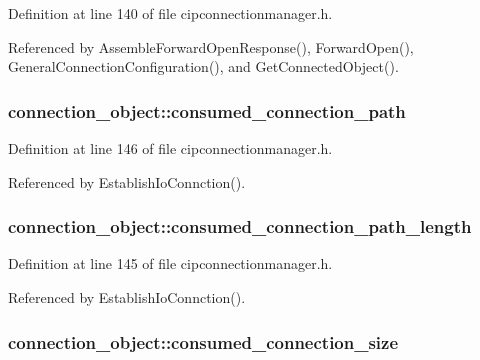 \-Definition at line 140 of file cipconnectionmanager.\-h.



\-Referenced by \-Assemble\-Forward\-Open\-Response(), \-Forward\-Open(), \-General\-Connection\-Configuration(), and \-Get\-Connected\-Object().

\hypertarget{structconnection__object_ab3ad0cdf7a707fb8554f0c2705999122}{
\subsubsection[{consumed\-\_\-connection\-\_\-path}]{ {\bf connection\-\_\-object\-::consumed\-\_\-connection\-\_\-path}}}\label{d1/d48/structconnection__object_ab3ad0cdf7a707fb8554f0c2705999122}


\-Definition at line 146 of file cipconnectionmanager.\-h.



\-Referenced by \-Establish\-Io\-Connction().

\hypertarget{structconnection__object_a65eb419da766d2f8a43fc03b14a152f3}{
\subsubsection[{consumed\-\_\-connection\-\_\-path\-\_\-length}]{ {\bf connection\-\_\-object\-::consumed\-\_\-connection\-\_\-path\-\_\-length}}}\label{d1/d48/structconnection__object_a65eb419da766d2f8a43fc03b14a152f3}


\-Definition at line 145 of file cipconnectionmanager.\-h.



\-Referenced by \-Establish\-Io\-Connction().

\hypertarget{structconnection__object_a657c244a2fd4dbc4f313470bb635748a}{
\subsubsection[{consumed\-\_\-connection\-\_\-size}]{ {\bf connection\-\_\-object\-::consumed\-\_\-connection\-\_\-size}}}\label{d1/d48/structconnection__object_a657c244a2fd4dbc4f313470bb635748a}


